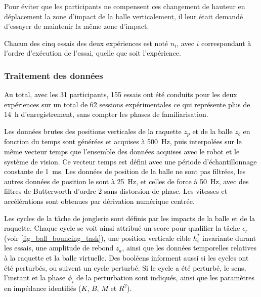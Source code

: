Pour éviter que les participants ne compensent ces changement de hauteur en déplacement la zone d'impact de la balle verticalement, il leur était demandé d'essayer de maintenir la même zone d'impact. %

\textcolor{black}{Chacun des cinq essais des deux expériences est noté $n_i$, avec $i$ correspondant à l'ordre d'exécution de l'essai, quelle que soit l'expérience.}

\subsubsection{Traitement des données} \label{chap4_sec_exp_sub_prot_4}

\textcolor{black}{Au total, avec les 31 participants, 155 essais ont été conduits pour les deux expériences sur un total de 62 sessions expérimentales ce qui représente plus de \SI{14}{\hour} d'enregistrement, sans compter les phases de familiarisation.}

\textcolor{black}{Les données brutes des positions verticales de la raquette $z_p$ et de la balle $z_b$ en fonction du temps sont générées et acquises à \SI{500}{\hertz}, puis interpolées sur le même vecteur temps que l'ensemble des données acquises avec le robot et le système de vision. Ce vecteur temps est défini avec une période d'échantillonnage constante de \SI{1}{\milli\second}. Les données de position de la balle ne sont pas filtrées, les autres données de position le sont à \SI{25}{\hertz}, et celles de force à \SI{50}{\hertz}, avec des filtres de Butterworth d'ordre 2 sans distorsion de phase. Les vitesses et accélérations sont obtenues par dérivation numérique centrée.}

\textcolor{black}{Les cycles de la tâche de jonglerie sont définis par les impacts de la balle et de la raquette. Chaque cycle se voit ainsi attribué un score pour qualifier la tâche $\epsilon_r$ (voir \cref{fig_ball_bouncing_task}), une position verticale cible $h_i^*$ invariante durant les essais, une amplitude de rebond $z_a$, ainsi que les données temporelles relatives à la raquette et la balle virtuelle. Des booléens informent aussi si les cycles ont été perturbés, ou suivent un cycle perturbé. Si le cycle a été perturbé, le sens, l'instant et la phase $\phi_i$ de la perturbation sont indiqués, ainsi que les paramètres en impédance identifiés ($K$, $B$, $M$ et $R^2$).}

